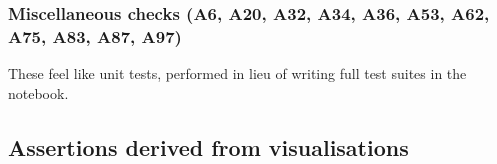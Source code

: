 \subsubsection{Miscellaneous checks (A6, A20, A32, A34, A36, A53, A62, A75, A83, A87, A97)}

These feel like unit tests, performed in lieu of writing full test suites in the notebook.



%
%



\subsection{Assertions derived from visualisations}


